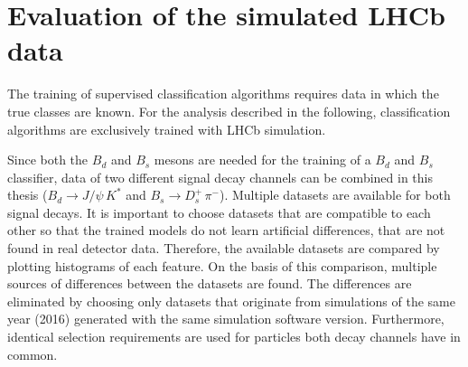 \section{Evaluation of the simulated LHCb data}

The training of supervised classification algorithms requires data in which the true classes are known.
For the analysis described in the following, classification algorithms are exclusively trained with LHCb simulation.

Since both the $B_d$ and $B_s$ mesons are needed for the training of a $B_d$ and $B_s$ classifier, data of two different signal decay channels can be combined in this thesis ($B_d \rightarrow J/\psi \, K^*$ and $B_s \rightarrow D^+_s \, \pi^-$). 
Multiple datasets are available for both signal decays.
It is important to choose datasets that are compatible to each other so that the trained models do not learn artificial differences, that are not found in real detector data.
Therefore, the available datasets are compared by plotting histograms of each feature.
On the basis of this comparison, multiple sources of differences between the datasets are found.
The differences are eliminated by choosing only datasets that originate from simulations of the same year (2016) generated with the same simulation software version. 
Furthermore, identical selection requirements are used for particles both decay channels have in common.




